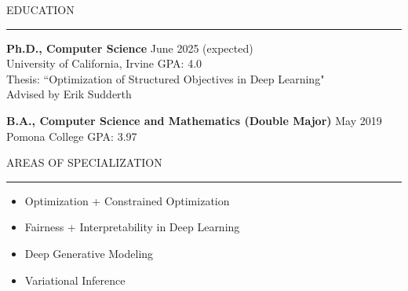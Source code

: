 \documentclass{resume} %
\renewenvironment{rSection}[1]{
\sectionskip
\textcolor{CarnegieMellonRed}{\MakeUppercase{#1}}
\sectionlineskip
\hrule
\begin{list}{}{
\setlength{\leftmargin}{1.5em}
}
\item[]
}{
\end{list}
}
\begin{document}
\vspace{2.em}
\begin{rSection}{Education}
{\bf Ph.D., Computer Science} \hfill { June 2025 (expected)} 
\\ University of California, Irvine \hfill { GPA: 4.0}
\\ Thesis: ``Optimization of Structured Objectives in Deep Learning"
\\ Advised by Erik Sudderth

{\bf B.A., Computer Science and Mathematics (Double Major)} \hfill { May 2019} 
\\ Pomona College \hfill { GPA: 3.97}\vspace{1.em}
\end{rSection}

\begin{rSection}{Areas of Specialization}
\begin{multicols}{2}
\begin{itemize}
    \item Optimization + Constrained Optimization
    \item Fairness + Interpretability in Deep Learning
    \item Deep Generative Modeling
    \item Variational Inference
\end{itemize}
\end{multicols}
\end{rSection}
\end{document}
